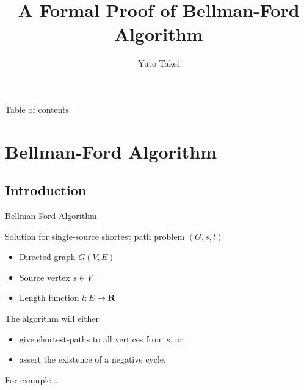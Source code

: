 \documentclass{beamer}
\begin{document}
\title{A Formal Proof of Bellman-Ford Algorithm}
\author[Yuto Takei]{Yuto Takei}

\maketitle

\begin{frame}{Table of contents}
\tableofcontents
\end{frame}

\section{Bellman-Ford Algorithm}
\frame{\sectionpage}

\subsection{Introduction}

\begin{frame}{Bellman-Ford Algorithm}

Solution for single-source shortest path problem $(G,s,l)$

\begin{itemize}
\item Directed graph $G(V,E)$
\item Source vertex $s\in V$
\item Length function $l: E\to \mathbf{R}$
\end{itemize}

\pause

The algorithm will either

\begin{itemize}
\item give shortest-paths to all vertices from $s$, or
\item assert the existence of a negative cycle.
\end{itemize}

\end{frame}

\begin{frame}{For example...}


\begin{itemize} 
\end{itemize}

\end{frame}
\end{document}
